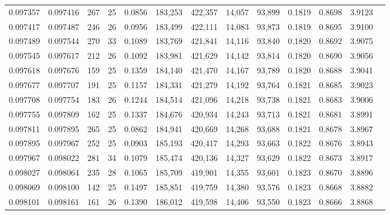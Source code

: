 \begin{tabular}{rrrrrrrrrrrrr}
0.097357 & 0.097416 & 267 &  25 &                                     0.0856 & 183,253 & 422,357 &  14,057 &  93,899 & 0.1819 & 0.8698 & 3.9123 \\
0.097417 & 0.097487 & 246 &  26 &                                     0.0956 & 183,499 & 422,111 &  14,083 &  93,873 & 0.1819 & 0.8695 & 3.9100 \\
0.097489 & 0.097544 & 270 &  33 &                                     0.1089 & 183,769 & 421,841 &  14,116 &  93,840 & 0.1820 & 0.8692 & 3.9075 \\
0.097545 & 0.097617 & 212 &  26 &                                     0.1092 & 183,981 & 421,629 &  14,142 &  93,814 & 0.1820 & 0.8690 & 3.9056 \\
0.097618 & 0.097676 & 159 &  25 &                                     0.1359 & 184,140 & 421,470 &  14,167 &  93,789 & 0.1820 & 0.8688 & 3.9041 \\
0.097677 & 0.097707 & 191 &  25 &                                     0.1157 & 184,331 & 421,279 &  14,192 &  93,764 & 0.1821 & 0.8685 & 3.9023 \\
0.097708 & 0.097754 & 183 &  26 &                                     0.1244 & 184,514 & 421,096 &  14,218 &  93,738 & 0.1821 & 0.8683 & 3.9006 \\
0.097755 & 0.097809 & 162 &  25 &                                     0.1337 & 184,676 & 420,934 &  14,243 &  93,713 & 0.1821 & 0.8681 & 3.8991 \\
0.097811 & 0.097895 & 265 &  25 &                                     0.0862 & 184,941 & 420,669 &  14,268 &  93,688 & 0.1821 & 0.8678 & 3.8967 \\
0.097895 & 0.097967 & 252 &  25 &                                     0.0903 & 185,193 & 420,417 &  14,293 &  93,663 & 0.1822 & 0.8676 & 3.8943 \\
0.097967 & 0.098022 & 281 &  34 &                                     0.1079 & 185,474 & 420,136 &  14,327 &  93,629 & 0.1822 & 0.8673 & 3.8917 \\
0.098027 & 0.098064 & 235 &  28 &                                     0.1065 & 185,709 & 419,901 &  14,355 &  93,601 & 0.1823 & 0.8670 & 3.8896 \\
0.098069 & 0.098100 & 142 &  25 &                                     0.1497 & 185,851 & 419,759 &  14,380 &  93,576 & 0.1823 & 0.8668 & 3.8882 \\
0.098101 & 0.098161 & 161 &  26 &                                     0.1390 & 186,012 & 419,598 &  14,406 &  93,550 & 0.1823 & 0.8666 & 3.8868 \\

\end{tabular}
